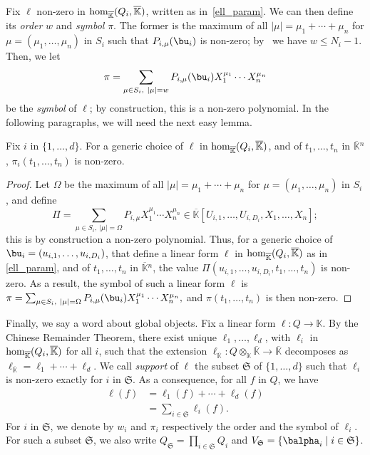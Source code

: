 \documentclass[12pt]{article}
\def\K{\mathbb{K}}
\def\K {\ensuremath{\mathbb{K}}}
\def\Kbar {{\ensuremath{\overline{\mathbb{K}}}}}
\begin{document}
Fix $\ell$ non-zero in ${\rm hom}_\Kbar(Q_i,\Kbar)$, written
as in~\eqref{ell_param}. We can then
define its {\em order} $w$ and {\em symbol} $\pi$. The former is
the maximum of all $|\mu|=\mu_1+\cdots+\mu_n$ for
$\mu=(\mu_1,\dots,\mu_n)$ in $S_i$ such that $P_{i,\mu}(\bu_i)$ is
non-zero; by~\cite[Lemma~3.3]{Mourrain97} we have $w \le
N_i-1$. Then, we let
$$\pi =\sum_{\mu \in S_i,\ |\mu|=w}P_{i,\mu}(\bu_i) X_1^{\mu_1} \cdots
X_n^{\mu_n}$$ be the {\em symbol} of $\ell$; by construction,
this is a non-zero polynomial. In the following paragraphs, we will
need the next easy lemma.

\begin{lemma}\label{lemma:symbol0}
  Fix $i$ in $\{1,\dots,d\}$. For a generic choice of $\ell$ in
  ${\rm hom}_\Kbar(Q_i,\Kbar)$, and of $t_1,\dots,t_n$ in $\Kbar{}^n$,
  $\pi_i(t_1,\dots,t_n)$ is non-zero.
\end{lemma}
\begin{proof}
  Let $\Omega$ be the maximum of all $|\mu|=\mu_1+\cdots+\mu_n$ for
  $\mu=(\mu_1,\dots,\mu_n)$ in $S_i$, and define 
	$$\Pi =\sum_{\mu \in S_i,\ |\mu|=\Omega}P_{i,\mu} X_1^{\mu_1}
  \cdots X_n^{\mu_n} \in
  \Kbar[U_{i,1},\dots,U_{i,D_i},X_1,\dots,X_n];$$ this is by
  construction a non-zero polynomial.  Thus, for a generic choice of
  $\bu_i=(u_{i,1},\dots,u_{i,D_i})$, that define a linear form
  $\ell$ in ${\rm hom}_\Kbar(Q_i,\Kbar)$ as in \cref{ell_param},
  and of $t_1,\dots,t_n$ in $\Kbar{}^n$, the value
  $\Pi(u_{i,1},\dots,u_{i,D_i},t_1,\dots,t_n)$ is non-zero. As a
  result, the symbol of such a linear form $\ell$ is $\pi
  =\sum_{\mu \in S_i,\ |\mu|=\Omega}P_{i,\mu}(\bu_i) X_1^{\mu_1}
  \cdots X_n^{\mu_n},$ and $\pi(t_1,\dots,t_n)$ is then non-zero.
\end{proof}

Finally, we say a word about global objects.  Fix a linear form $\ell:
Q \to \K$. By the Chinese Remainder Theorem, there exist unique
$\ell_1,\dots,\ell_d$, with $\ell_i$ in ${\rm hom}_\Kbar(Q_i,\Kbar)$
for all $i$, such that the extension $\ell_\Kbar: Q\otimes_\K \Kbar
\to \Kbar$ decomposes as $\ell_\Kbar = \ell_1 + \cdots + \ell_d$. We
call {\em support} of $\ell$ the subset $\mathfrak{S}$ of
$\{1,\dots,d\}$ such that $\ell_i$ is non-zero exactly for $i$ in
$\mathfrak{S}$.  As a consequence, for all $f$ in $Q$, we have
\begin{align}\label{eq:fui}
\ell(f) &= \ell_1(f) + \cdots + \ell_d(f)\nonumber\\
&=  \sum_{i \in \mathfrak{S}} \ell_i(f).
\end{align}
For $i$ in $\mathfrak{S}$, we denote by $w_i$ and $\pi_i$ respectively
the order and the symbol of $\ell_i$. For such a subset
$\mathfrak{S}$, we also write $Q_\mathfrak{S}=\prod_{i \in
  \mathfrak{S}} Q_i$ and $V_\mathfrak{S}=
\{\balpha_i \mid i \in \mathfrak{S}\}$.
\end{document}
